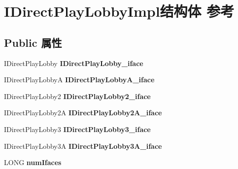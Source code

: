 \hypertarget{struct_i_direct_play_lobby_impl}{}\section{I\+Direct\+Play\+Lobby\+Impl结构体 参考}
\label{struct_i_direct_play_lobby_impl}
\subsection*{Public 属性}
\begin{DoxyCompactItemize}
\item 
\mbox{\label{struct_i_direct_play_lobby_impl_a1555dd77b472a756ba7027dc09dfcfc4}} 
I\+Direct\+Play\+Lobby {\bfseries I\+Direct\+Play\+Lobby\+\_\+iface}
\item 
\mbox{\label{struct_i_direct_play_lobby_impl_aaa24a02792cbd583d042ae4b94644932}} 
I\+Direct\+Play\+LobbyA {\bfseries I\+Direct\+Play\+Lobby\+A\+\_\+iface}
\item 
\mbox{\label{struct_i_direct_play_lobby_impl_a0692c4d263d1046e967e55f6548780a0}} 
I\+Direct\+Play\+Lobby2 {\bfseries I\+Direct\+Play\+Lobby2\+\_\+iface}
\item 
\mbox{\label{struct_i_direct_play_lobby_impl_a25aa1b0bda77382661c7525552c400bf}} 
I\+Direct\+Play\+Lobby2A {\bfseries I\+Direct\+Play\+Lobby2\+A\+\_\+iface}
\item 
\mbox{\label{struct_i_direct_play_lobby_impl_a9036cd845bcfe57b32a899f8ec3bff8b}} 
I\+Direct\+Play\+Lobby3 {\bfseries I\+Direct\+Play\+Lobby3\+\_\+iface}
\item 
\mbox{\label{struct_i_direct_play_lobby_impl_aceb0f588646bed9ae83041b61a08a4a7}} 
I\+Direct\+Play\+Lobby3A {\bfseries I\+Direct\+Play\+Lobby3\+A\+\_\+iface}
\item 
\mbox{\label{struct_i_direct_play_lobby_impl_acd560586ef386cdb8429cb04ab9e6f8e}} 
L\+O\+NG {\bfseries num\+Ifaces}
\item 
\mbox{\label{struct_i_direct_play_lobby_impl_af73e321bd5ea8b4909ca9ed062e9a997}} 

\end{DoxyCompactItemize}
